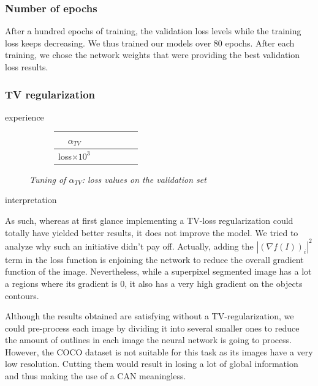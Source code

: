 \documentclass{article}
\begin{document}
        \subsubsection{Number of epochs}
            After a hundred epochs of training, the validation loss levels while the training loss keeps decreasing. We thus trained our models over 80 epochs. After each training, we chose the network weights that were providing the best validation loss results.

        \subsubsection{TV regularization}
            experience \cite{todo:tv-tuning}

            \begin{figure}[!ht]
                \begin{subfigure}{.49\linewidth}
                    \centering
                    \begin{tabular}{|c|c|c|c|c|c|}
                        \hline
                        $\alpha_{TV}$ &   &   &   &   &   \\
                        \hline \hline
                        loss$\times 10^3$ &   &   &   &   &  \\
                        \hline
                    \end{tabular}
                \end{subfigure}
                \begin{subfigure}{.49\linewidth}
                    \centering
                \end{subfigure}
                \caption{\textit{Tuning of $\alpha_{TV}$: loss values on the validation set}}
            \end{figure}
            \par
            interpretation \cite{toto:tv-interpretation}
            \par
            As such, whereas at first glance implementing a TV-loss regularization could totally have yielded better results, it does not improve the model. We tried to analyze why such an initiative didn't pay off. Actually, adding the $|(\nabla f(I))_i|^2$ term in the loss function is enjoining the network to reduce the overall gradient function of the image. Nevertheless, while a superpixel segmented image has a lot a regions where its gradient is 0, it also has a very high gradient on the objects contours.
            \par
            Although the results obtained are satisfying without a TV-regularization, we could pre-process each image by dividing it into several smaller ones to reduce the amount of outlines in each image the neural network is going to process. However, the COCO dataset is not suitable for this task as its images have a very low resolution. Cutting them would result in losing a lot of global information and thus making the use of a CAN meaningless.
\end{document}
